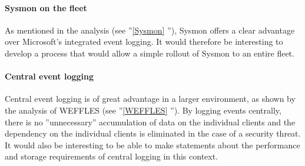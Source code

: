 \paragraph{Sysmon on the fleet}
As mentioned in the analysis (see ''\ref{Sysmon} ''), Sysmon offers a clear advantage over Microsoft's integrated event logging. It would therefore be interesting to develop a process that would allow a simple rollout of Sysmon to an entire fleet.

\paragraph{Central event logging}
Central event logging is of great advantage in a larger environment, as shown by the analysis of WEFFLES (see ''\ref{WEFFLES} ''). By logging events centrally, there is no ''unnecessary'' accumulation of data on the individual clients and the dependency on the individual clients is eliminated in the case of a security threat. It would also be interesting to be able to make statements about the performance and storage requirements of central logging in this context.
